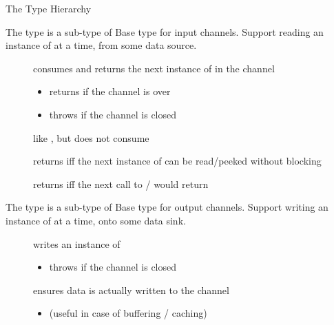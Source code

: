 \documentclass[handout]{beamer}
\begin{document}
\begin{frame}[allowframebreaks]{The  Type Hierarchy}
    \framebreak

    \begin{block}{The  type is a sub-type of }\centering
        Base type for \alert{input} channels.
        Support reading an instance of  at a time, from some data source.
    \end{block}
    \begin{description}
        \item[] consumes and returns the next instance of  in the channel
        \begin{itemize}\small
            \item returns  if the channel is \alert{over}
            \item throws  if the channel is \alert{closed}
        \end{itemize}
        \item[] like , but does not consume
        \item[] returns  iff  the next instance of  can be read/peeked without blocking
        \item[] returns  iff the next call to / would return 
    \end{description}

    \framebreak

    \begin{block}{The  type is a sub-type of }\centering
        Base type for \alert{output} channels.
        Support writing an instance of  at a time, onto some data sink.
    \end{block}
    \begin{description}
        \item[] writes an instance of 
        \begin{itemize}\small
            \item throws  if the channel is \alert{closed}
        \end{itemize}
        \item[] ensures data is actually written to the channel
        \begin{itemize}\small
            \item (useful in case of buffering / caching)
        \end{itemize}
    \end{description}

\end{frame}
\end{document}
